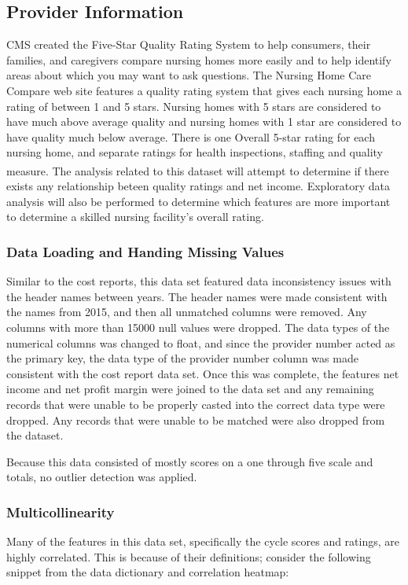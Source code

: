 \documentclass{article}
\theoremstyle{mytheoremstyle}
\theoremstyle{mytheoremstyle}
\theoremstyle{myproblemstyle}
\begin{document}
\pagebreak

\subsection{Provider Information}
CMS created the Five-Star Quality Rating System to help consumers, their families, and caregivers compare nursing homes more easily and to help identify areas about which you may want to ask questions.  The Nursing Home Care Compare web site features a quality rating system that gives each nursing home a rating of between 1 and 5 stars.  Nursing homes with 5 stars are considered to have much above average quality and nursing homes with 1 star are considered to have quality much below average.  There is one Overall 5-star rating for each nursing home, and separate ratings for health inspections, staffing and quality measure\textsuperscript{\cite{cmsfive2023}}\textsuperscript{\cite{provCMS}}. The analysis related to this dataset will attempt to determine if there exists any relationship beteen quality ratings and net income. Exploratory data analysis will also be performed to determine which features are more important to determine a skilled nursing facility's overall rating. 

\subsubsection{Data Loading and Handing Missing Values}
Similar to the cost reports, this data set featured data inconsistency issues with the header names between years. The header names were made consistent with the names from 2015, and then all unmatched columns were removed. Any columns with more than 15000 null values were dropped. The data types of the numerical columns was changed to float, and since the provider number acted as the primary key, the data type of the provider number column was made consistent with the cost report data set. Once this was complete, the features net income and net profit margin were joined to the data set and any remaining records that were unable to be properly casted into the correct data type were dropped. Any records that were unable to be matched were also dropped from the dataset.

Because this data consisted of mostly scores on a one through five scale and totals, no outlier detection was applied. 

\subsubsection{Multicollinearity}
Many of the features in this data set, specifically the cycle scores and ratings, are highly correlated. This is because of their definitions; consider the following snippet from the data dictionary and correlation heatmap:
\end{document}
